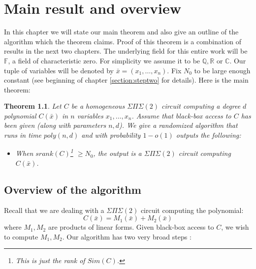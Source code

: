 \documentclass[12pt]{caltech_thesis}
\theoremstyle{plain}
\newtheorem{theorem}{Theorem}
\theoremstyle{definition}
\newcommand{\F}{\mathbb{F}}
\newcommand{\C}{\mathbb{C}}
\newcommand{\Q}{\mathbb{Q}}
\newcommand{\R}{\mathbb{R}}
\newcommand{\B}[1]{\bar{#1}}
\begin{document}
\chapter{Main result and overview} \label{chapter:charzero}
In this chapter we will state our main theorem and also give an outline of the algorithm which the theorem claims. Proof of this theorem
is a combination of results in the next two chapters.
The underlying field for this entire work will be $\F$, a field of characteristic zero. For simplicity we assume it to be $\Q,\R$ or $\C$. 
Our tuple of variables will be denoted by
$\B{x} = (x_1,\ldots,x_n)$. Fix $N_0$ to be large enough constant (see beginning of chapter \ref{section:steptwo} for details). 
Here is the main theorem:

\begin{theorem}\label{theorem:maintheorem2}
Let $C$ be a homogeneous $\Sigma\Pi\Sigma(2)$ circuit computing a degree $d$ polynomial $C(\B{x})$ in $n$ variables $x_1,\ldots,x_n$. 
Assume that black-box access to 
$C$ has been given (along with parameters $n,d$). We give a randomized algorithm that runs in time $poly(n,d)$ and with 
 probability $1-o(1)$ outputs the following:
\begin{itemize}
 \item When $srank(C)$\footnote{This is just the rank of $Sim(C)$.} $\geq N_0$, the output is a $\Sigma\Pi\Sigma(2)$ circuit computing $C(\B{x})$.
 \end{itemize}
\end{theorem}

\section{Overview of the algorithm }

Recall that we are dealing with a $\Sigma\Pi\Sigma(2)$ circuit computing the polynomial:
\[
 C(\B{x}) = M_1(\B{x}) + M_2(\B{x})
\]
where $M_1,M_2$ are products of linear forms. Given black-box access to $C$, we wish to compute $M_1,M_2$. Our algorithm has two
very broad steps :
\end{document}
